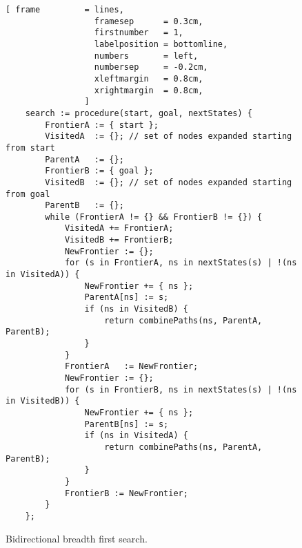 \begin{figure}[!ht]
\centering
\begin{Verbatim}[ frame         = lines, 
                  framesep      = 0.3cm, 
                  firstnumber   = 1,
                  labelposition = bottomline,
                  numbers       = left,
                  numbersep     = -0.2cm,
                  xleftmargin   = 0.8cm,
                  xrightmargin  = 0.8cm,
                ]
    search := procedure(start, goal, nextStates) {
        FrontierA := { start };
        VisitedA  := {}; // set of nodes expanded starting from start
        ParentA   := {};
        FrontierB := { goal };
        VisitedB  := {}; // set of nodes expanded starting from goal
        ParentB   := {};
        while (FrontierA != {} && FrontierB != {}) {
            VisitedA += FrontierA;
            VisitedB += FrontierB;
            NewFrontier := {};
            for (s in FrontierA, ns in nextStates(s) | !(ns in VisitedA)) {
                NewFrontier += { ns };
                ParentA[ns] := s;
                if (ns in VisitedB) {
                    return combinePaths(ns, ParentA, ParentB);
                }
            }
            FrontierA   := NewFrontier;
            NewFrontier := {};
            for (s in FrontierB, ns in nextStates(s) | !(ns in VisitedB)) {
                NewFrontier += { ns };
                ParentB[ns] := s;
                if (ns in VisitedA) {
                    return combinePaths(ns, ParentA, ParentB);
                }
            }
            FrontierB := NewFrontier;
        }
    };
\end{Verbatim}
\vspace*{-0.3cm}
\caption{Bidirectional breadth first search.}
\label{fig:bidirectional-bfs.stlx}
\end{figure}

